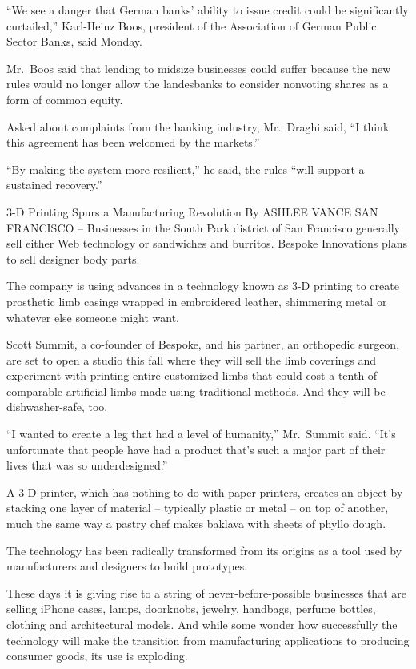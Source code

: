 ﻿\documentclass[12pt]{article}
\begin{document}
``We see a danger that German banks' ability to issue credit could be significantly curtailed,''
Karl-Heinz Boos, president of the Association of German Public Sector Banks, said Monday.

Mr.~Boos said that lending to midsize businesses could suffer because the new rules would no longer
allow the landesbanks to consider nonvoting shares as a form of common equity.

Asked about complaints from the banking industry, Mr.~Draghi said, ``I think this agreement has been
welcomed by the markets.''

``By making the system more resilient,'' he said, the rules ``will support a sustained recovery.''

3-D Printing Spurs a Manufacturing Revolution By ASHLEE VANCE SAN FRANCISCO -- Businesses in the
South Park district of San Francisco generally sell either Web technology or sandwiches and
burritos. Bespoke Innovations plans to sell designer body parts.

The company is using advances in a technology known as 3-D printing to create prosthetic limb
casings wrapped in embroidered leather, shimmering metal or whatever else someone might want.

Scott Summit, a co-founder of Bespoke, and his partner, an orthopedic surgeon, are set to open a
studio this fall where they will sell the limb coverings and experiment with printing entire
customized limbs that could cost a tenth of comparable artificial limbs made using traditional
methods. And they will be dishwasher-safe, too.

``I wanted to create a leg that had a level of humanity,'' Mr.~Summit said. ``It's unfortunate that
people have had a product that's such a major part of their lives that was so underdesigned.''

A 3-D printer, which has nothing to do with paper printers, creates an object by stacking one layer
of material -- typically plastic or metal -- on top of another, much the same way a pastry chef
makes baklava with sheets of phyllo dough.

The technology has been radically transformed from its origins as a tool used by manufacturers and
designers to build prototypes.

These days it is giving rise to a string of never-before-possible businesses that are selling iPhone
cases, lamps, doorknobs, jewelry, handbags, perfume bottles, clothing and architectural models. And
while some wonder how successfully the technology will make the transition from manufacturing
applications to producing consumer goods, its use is exploding.
\end{document}
